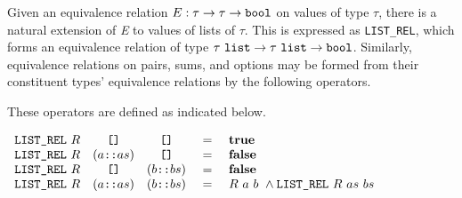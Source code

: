 \documentclass[envcountsame,runningheads]{llncs}
\begin{document}
Given an equivalence relation
$E:\tau \rightarrow \tau \rightarrow \mbox{\tt bool}$
on values of type $\tau$,
there is a natural extension of {\it E\/} to values of lists of $\tau$.
This is expressed as {\tt LIST\_REL},
which forms an equivalence relation of type
$\tau\ \mbox{\tt list} \rightarrow \tau\ \mbox{\tt list} \rightarrow \mbox{\tt bool}$.
Similarly, equivalence relations on pairs, sums, and options
may be formed
from their constituent types' equivalence relations by the following operators.

\begin{center}
\end{center}

These operators are defined
as indicated below.

\begin{definition}
\label{listrel}
$\begin{array}[t]{lcccl}
\mbox{\tt LIST\_REL}\ R & \mbox{\tt []} & \mbox{\tt []} & \ = \  & \mbox{\bf true} \\
\mbox{\tt LIST\_REL}\ R & (a \mbox{\tt ::} as) & \mbox{\tt []} & \ = \ & \mbox{\bf false}\\
\mbox{\tt LIST\_REL}\ R & \mbox{\tt []} & (b \mbox{\tt ::} bs) & \ = \  & \mbox{\bf false}\\
\mbox{\tt LIST\_REL}\ R & (a \mbox{\tt ::} as) & (b \mbox{\tt ::} bs) & \ = \
   & R\ a\ b\ \wedge \mbox{\tt LIST\_REL}\ R\ as\ bs
\end{array}$
\end{definition}
\end{document}
